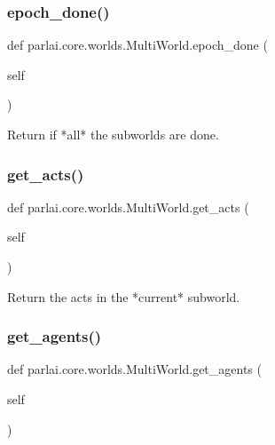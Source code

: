 \subsubsection{\texorpdfstring{epoch\+\_\+done()}{epoch\_done()}}
{\footnotesize\ttfamily def parlai.\+core.\+worlds.\+Multi\+World.\+epoch\+\_\+done (\begin{DoxyParamCaption}\item[{}]{self }\end{DoxyParamCaption})}

\begin{DoxyVerb}Return if *all* the subworlds are done.
\end{DoxyVerb}
 \mbox{\label{classparlai_1_1core_1_1worlds_1_1MultiWorld_a73074f333544de25b4e07ffc48819896}} 
\subsubsection{\texorpdfstring{get\+\_\+acts()}{get\_acts()}}
{\footnotesize\ttfamily def parlai.\+core.\+worlds.\+Multi\+World.\+get\+\_\+acts (\begin{DoxyParamCaption}\item[{}]{self }\end{DoxyParamCaption})}

\begin{DoxyVerb}Return the acts in the *current* subworld.
\end{DoxyVerb}
 \mbox{\label{classparlai_1_1core_1_1worlds_1_1MultiWorld_a6e012b3db760d95f189baf3466fc55d0}} 
\subsubsection{\texorpdfstring{get\+\_\+agents()}{get\_agents()}}
{\footnotesize\ttfamily def parlai.\+core.\+worlds.\+Multi\+World.\+get\+\_\+agents (\begin{DoxyParamCaption}\item[{}]{self }\end{DoxyParamCaption})}


